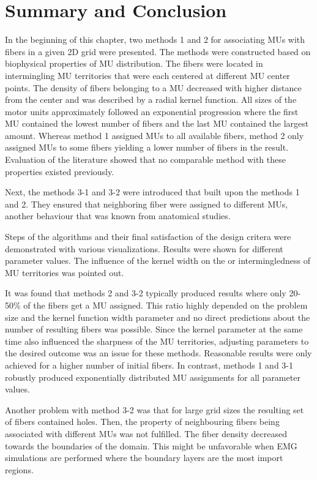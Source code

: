 \section{Summary and Conclusion}\label{sec:mu_conclusion}
In the beginning of this chapter, two methods 1 and 2 for associating MUs with fibers in a given 2D grid were presented. The methods were constructed based on biophysical properties of MU distribution. The fibers were located in intermingling MU territories that were each centered at different MU center points.
The density of fibers belonging to a MU decreased with higher distance from the center and was described by a radial kernel function.
All sizes of the motor units approximately followed an exponential progression where the first MU contained the lowest number of fibers and the last MU contained the largest amount. 
Whereas method 1 assigned MUs to all available fibers, method 2 only assigned MUs to some fibers yielding a lower number of fibers in the result.
Evaluation of the literature showed that no comparable method with these properties existed previously.

Next, the methods 3-1 and 3-2 were introduced that built upon the methods 1 and 2. They ensured that neighboring fiber were assigned to different MUs, another behaviour that was known from anatomical studies.

Steps of the algorithms and their final satisfaction of the design critera were demonstrated with various visualizations. Results were shown for different parameter values. The influence of the kernel width on the  or intermingledness of MU territories was pointed out. 

It was found that methods 2 and 3-2 typically produced results where only 20-50\% of the fibers get a MU assigned. This ratio highly depended on the problem size and the kernel function width parameter and no direct predictions about the number of resulting fibers was possible. Since the kernel parameter at the same time also influenced the sharpness of the MU territories, adjusting parameters to the desired outcome was an issue for these methods. Reasonable results were only achieved for a higher number of initial fibers. In contrast, methods 1 and 3-1 robustly produced exponentially distributed MU assignments for all parameter values.

Another problem with method 3-2 was that for large grid sizes the resulting set of fibers contained holes. Then, the property of neighbouring fibers being associated with different MUs was not fulfilled. The fiber density decreased towards the boundaries of the domain. This might be unfavorable when EMG simulations are performed where the boundary layers are the most import regions.

